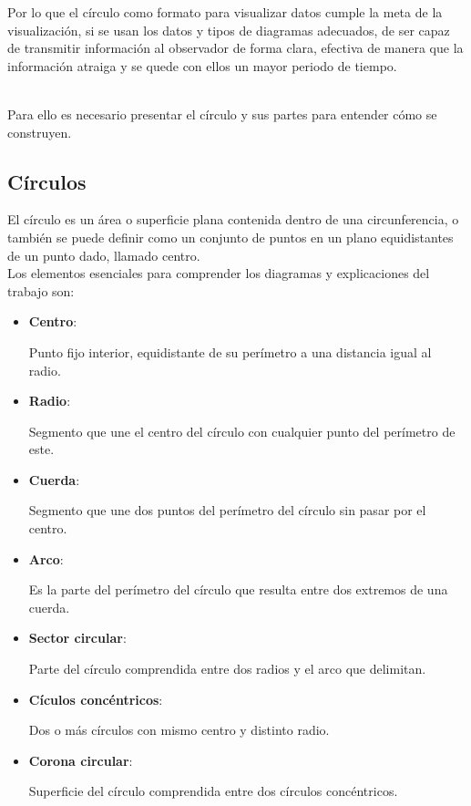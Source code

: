 \documentclass{article}\usepackage[]{graphicx}\usepackage[]{color}
\begin{document}
Por lo que el c\'irculo como formato para visualizar datos cumple la meta de la visualizaci\'on, si se usan los datos y tipos de diagramas adecuados, de ser capaz de transmitir informaci\'on al observador de forma clara, efectiva de manera que la informaci\'on atraiga y se quede con ellos un mayor periodo de tiempo.~\\~\par
Para ello es necesario presentar el c\'irculo y sus partes para entender c\'omo se construyen.
~\\
\subsection{C\'irculos}
El c\'irculo es un \'area o superficie plana contenida dentro de una circunferencia\cite{rae}, o tambi\'en se puede definir como un conjunto de puntos en un plano equidistantes de un punto dado, llamado centro\cite{circulo}.~\\
Los elementos esenciales para comprender los diagramas y explicaciones del trabajo son:
\begin{itemize}
\item \textbf{Centro}:~\par Punto fijo interior, equidistante de su per\'imetro a una distancia igual al radio.
\item \textbf{Radio}:~\par Segmento que une el centro del c\'irculo con cualquier punto del per\'imetro de este.
\item \textbf{Cuerda}:~\par Segmento que une dos puntos del per\'imetro del c\'irculo sin pasar por el centro.
\item \textbf{Arco}:~\par Es la parte del per\'imetro del c\'irculo que resulta entre dos extremos de una cuerda.
\item \textbf{Sector circular}:~\par Parte del c\'irculo comprendida entre dos radios y el arco que delimitan.
\item \textbf{C\'iculos conc\'entricos}:~\par Dos o m\'as c\'irculos con mismo centro y distinto radio.
\item \textbf{Corona circular}:~\par Superficie del c\'irculo comprendida entre dos c\'irculos conc\'entricos.
\end{itemize}
\clearpage
\end{document}
